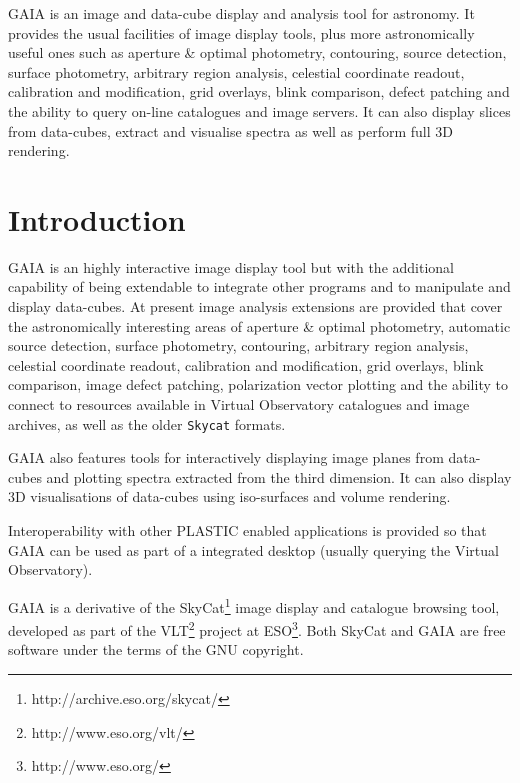 \documentclass[twoside,11pt]{article}
\newcommand{\stardocinitials}  {SUN}
\newcommand{\stardocnumber}    {214.36}
\newcommand{\stardocabstract} {GAIA is an image and data-cube display 
and analysis tool for astronomy. It provides the usual facilities of image
display tools, plus more astronomically useful ones such as aperture \&
optimal photometry, contouring, source detection, surface photometry,
arbitrary region analysis, celestial coordinate readout, calibration
and modification, grid overlays, blink comparison, defect patching and
the ability to query on-line catalogues and image servers. It can 
also display slices from data-cubes, extract and visualise spectra as 
well as perform full 3D rendering.}
\newcommand{\stardocname}{\stardocinitials /\stardocnumber}
\newcommand{\htmladdnormallinkfoot}[2]{#1\footnote{#2}}
\newenvironment{latexonly}{}{}
\newcommand{\xlabel}[1]{}
\renewcommand{\_}{\texttt{\symbol{95}}}
\newcommand{\mytt}[1]{{\texttt{#1}}}
\renewcommand{\thepage}{\roman{page}}
\begin{document}
\stardocabstract
  \newpage
  \begin{latexonly}
    \setlength{\parskip}{0mm}
    \tableofcontents
    \setlength{\parskip}{\medskipamount}
    \markboth{\stardocname}{\stardocname}
  \end{latexonly}
\cleardoublepage
\renewcommand{\thepage}{\arabic{page}}
\setcounter{page}{1}


\section{Introduction\xlabel{introduction}\label{introduction}}

GAIA is an highly interactive image display tool but with the additional
capability of being extendable to integrate other programs and to manipulate
and display data-cubes.  At present image analysis extensions are provided
that cover the astronomically interesting areas of aperture \& optimal
photometry, automatic source detection, surface photometry, contouring,
arbitrary region analysis, celestial coordinate readout, calibration and
modification, grid overlays, blink comparison, image defect patching,
polarization vector plotting and the ability to connect to resources available
in Virtual Observatory catalogues and image archives, as well as the older
\mytt{Skycat} formats.

GAIA also features tools for interactively displaying image planes from
data-cubes and plotting spectra extracted from the third dimension. It can
also display 3D visualisations of data-cubes using iso-surfaces and volume
rendering.

Interoperability with other PLASTIC enabled applications is provided so that
GAIA can be used as part of a integrated desktop (usually querying the
Virtual Observatory).

GAIA is a derivative of the
\htmladdnormallinkfoot{SkyCat}{http://archive.eso.org/skycat/} image
display and catalogue browsing tool, developed as part of the
\htmladdnormallinkfoot{VLT}{http://www.eso.org/vlt/} project at
\htmladdnormallinkfoot{ESO}{http://www.eso.org/}. Both SkyCat and GAIA are
free software under the terms of the GNU copyright.
\end{document}

